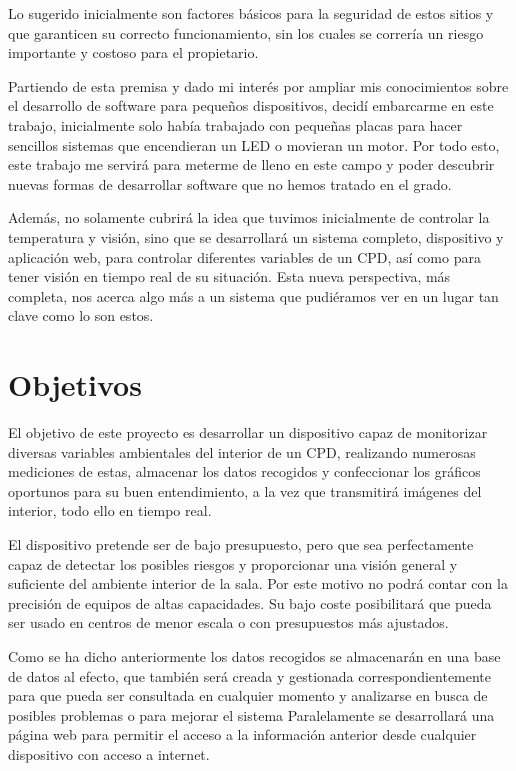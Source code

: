 Lo sugerido inicialmente son factores básicos para la seguridad de estos sitios y que garanticen su correcto funcionamiento, sin los cuales se correría un riesgo importante y costoso para el propietario.

Partiendo de esta premisa y dado mi interés por ampliar mis conocimientos sobre el desarrollo de software para pequeños dispositivos, decidí embarcarme en este trabajo, inicialmente solo había trabajado con pequeñas placas para hacer sencillos sistemas que encendieran un LED o movieran un motor. Por todo esto, este trabajo me servirá para meterme de lleno en este campo y poder descubrir nuevas formas de desarrollar software que no hemos tratado en el grado.

Además, no solamente cubrirá la idea que tuvimos inicialmente de controlar la temperatura y visión, sino que se desarrollará un sistema completo, dispositivo y aplicación web, para controlar diferentes variables de un CPD, así como para tener visión en tiempo real de su situación. Esta nueva perspectiva, más completa, nos acerca algo más a un sistema que pudiéramos ver en un lugar tan clave como lo son estos.

\section{Objetivos}
El objetivo de este proyecto es desarrollar un dispositivo capaz de monitorizar diversas variables ambientales del interior de un CPD, realizando numerosas mediciones de estas, almacenar los datos recogidos y confeccionar los gráficos oportunos para su buen entendimiento, a la vez que transmitirá imágenes del interior, todo ello en tiempo real.

El dispositivo pretende ser de bajo presupuesto, pero que sea perfectamente capaz de detectar los posibles riesgos y proporcionar una visión general y suficiente del ambiente interior de la sala. Por este motivo no podrá contar con la precisión de equipos de altas capacidades. Su bajo coste posibilitará que pueda ser usado en centros de menor escala o con presupuestos más ajustados.

Como se ha dicho anteriormente los datos recogidos se almacenarán en una base de datos al efecto, que también será creada y gestionada correspondientemente para que pueda ser consultada  en cualquier momento y analizarse en busca de posibles problemas o para mejorar el sistema Paralelamente se desarrollará una página web para permitir el acceso a la información anterior desde cualquier dispositivo con acceso a internet.

